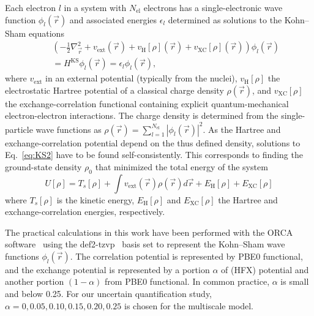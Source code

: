 \documentclass[%
 reprint,
 amsmath,amssymb,
 aps,
]{revtex4-2}
\begin{document}
Each electron $l$ in a system with $N_\text{el}$ electrons has a single-electronic wave function $\phi_l (\vec{r})$ and associated energies $\epsilon_l$ determined as solutions to the Kohn--Sham equations~\cite{kohn_self_1965}
%
\begin{eqnarray}
    && \left(-\frac{1}{2}\nabla^2_{\vec{r}} + v_\text{ext}(\vec{r}) + v_\text{H}[\rho](\vec{r}) + v_\text{XC}[\rho](\vec{r})\right) \phi_l(\vec{r}) \nonumber \\
    && = H^\text{KS} \phi_l(\vec{r}) = \epsilon_l \phi_l (\vec{r}) ,
    \label{eq:KS2}
\end{eqnarray}
%
where $v_\text{ext}$ in an external potential (typically from the nuclei), $v_\text{H}[\rho]$ the electrostatic Hartree potential of a classical charge density $\rho(\vec{r})$, and $v_\text{XC}[\rho]$ the exchange-correlation functional containing explicit quantum-mechanical electron-electron interactions. The charge density is determined from the single-particle wave functions as $\rho(\vec{r})=\sum\limits_{l=1}^{N_\text{el}} \left\vert\phi_l(\vec{r})\right\vert^2$. As the Hartree and exchange-correlation potential depend on the thus defined density, solutions to Eq.~\ref{eq:KS2} have to be found self-consistently. This corresponds to finding the ground-state density $\rho_0$ that minimized the total energy of the system
%
\begin{equation}
    U[\rho] = T_s[\rho] + \int v_\text{ext}(\vec{r}) \rho(\vec{r}) d \vec{r} + E_\text{H}[\rho] + E_\text{XC}[\rho]
    \label{eq:KS_model}
\end{equation}
%
where $T_s[\rho]$ is the kinetic energy, $E_\text{H}[\rho]$ and $E_\text{XC}[\rho]$ the Hartree and exchange-correlation energies, respectively. 

The practical calculations in this work have been performed with the ORCA software~\cite{Neese2012a} using the def2-tzvp~\cite{weigend_accurate_2006} basis set to represent the Kohn--Sham wave functions $\phi_l(\vec{r})$. 
The correlation potential is represented by PBE0 functional, and the exchange potential is represented by a portion $\alpha$ of (HFX) potential and another portion $(1-\alpha)$ from PBE0 functional. In common practice, $\alpha$ is small and below 0.25. For our uncertain quantification study, $\alpha=0,0.05,0.10,0.15,0.20,0.25$ is chosen for the multiscale model.
\end{document}
